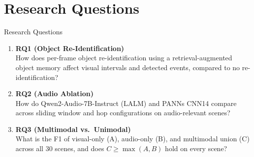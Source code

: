 \documentclass[aspectratio=169,10pt]{beamer}
\begin{document}
\section{Research Questions}
\begin{frame}{Research Questions}
\begin{enumerate}
  \item \textbf{RQ1 (Object Re-Identification)}\\
  How does per-frame object re-identification using a retrieval-augmented object memory affect visual intervals and detected events, compared to no re-identification?
  \vspace{0.4em}

  \item \textbf{RQ2 (Audio Ablation)}\\
  How do Qwen2-Audio-7B-Instruct (LALM) and PANNs CNN14 compare across sliding window and hop configurations on audio-relevant scenes?
  \vspace{0.4em}

  \item \textbf{RQ3 (Multimodal vs.\ Unimodal)}\\
  What is the F1 of visual-only (A), audio-only (B), and multimodal union (C) across all 30 scenes, and does $C \ge \max(A,B)$ hold on every scene?
\end{enumerate}
\end{frame}

\end{document}
